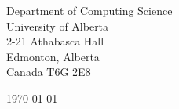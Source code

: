 \begin{minipage}{0.49\textwidth}
\begin{flushleft}
\noindent
Department of Computing Science\\
University of Alberta\\
2-21 Athabasca Hall\\
Edmonton, Alberta\\
Canada T6G 2E8\\
\end{flushleft}
\end{minipage}
\begin{minipage}{0.47\textwidth}
\begin{flushright}
\today
\end{flushright}
\end{minipage} \\

\newcommand{\univ}{University of Alberta}
\newcommand{\univshort}{UofA}
\newcommand{\degree}{Ph.D.}
\newcommand{\dept}{Computer Science}
